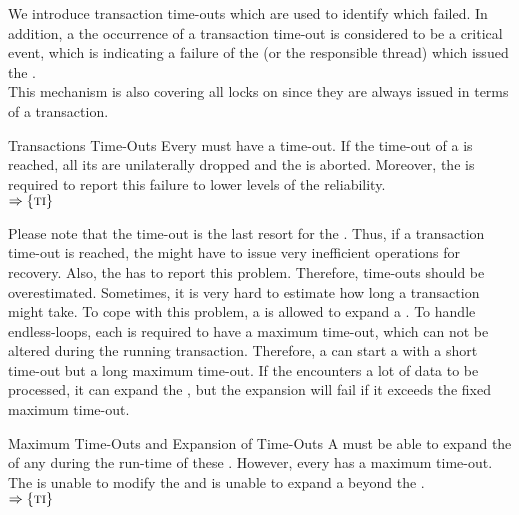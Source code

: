 \documentclass[a4paper, 12pt]{book}
\newcommand{\INTERFACE}[1]{$\Rightarrow\left\{#1\right\}$}
\begin{document}
We introduce transaction time-outs which are used to identify 
which failed. In addition, a the occurrence of a transaction time-out is
considered to be a critical event, which is indicating a failure of the
 (or the responsible thread) which issued the .\\
%
This mechanism is also covering all locks on  since they are
always issued in terms of a transaction. 
%
\begin{requirement*}{Transactions Time-Outs}
  Every  must have a time-out. If the time-out of a
   is reached, all its  are unilaterally dropped and
  the  is aborted. Moreover, the \SYNEIGHT is required
  to report this failure to lower levels of the reliability.\\
  \INTERFACE{\TRANSACTION}
\end{requirement*}
%
Please note that the time-out is the last resort for the \SYNEIGHT.
Thus, if a transaction time-out is reached, the \SYNEIGHT might have to
issue very inefficient operations for recovery. Also, the \SYNEIGHT has
to report this problem. Therefore, time-outs should be overestimated.
%
Sometimes, it is very hard to estimate how long a transaction might take. To
cope with this problem, a  is allowed to expand a . To handle endless-loops, each  is required to
have a maximum time-out, which can not be altered during the running
transaction. Therefore, a  can start a  with a
short time-out but a long maximum time-out. If the  encounters a
lot of data to be processed, it can expand the , but the
expansion will fail if it exceeds the fixed maximum time-out. 
%
\begin{requirement*}{Maximum Time-Outs and Expansion of Time-Outs}
  A  must be able to expand the  of any
   during the run-time of these . However,
  every  has a maximum time-out. The  is unable to
  modify the  and is unable to expand a  beyond the .\\
  \INTERFACE{\TRANSACTION}
\end{requirement*}

\end{document}

